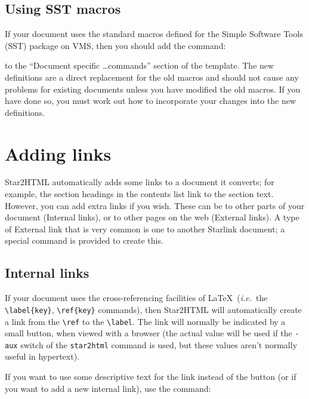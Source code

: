 \documentclass[twoside,11pt,nolof]{starlink}
\begin{document}
\subsection{Using SST macros}

If your document uses the standard macros defined for the Simple
Software Tools (SST) package on VMS, then you should add the command:
\begin{terminalv}

\end{terminalv}
to the ``Document specific \ldots commands'' section of the template.
The new definitions are a direct replacement for the old macros and should not
cause any problems for existing documents unless you have modified the old
macros.
If you have done so, you must work out how to incorporate your changes into
the new definitions.

\section{Adding links}

Star2HTML automatically adds some links to a document it converts; for example,
the section headings in the contents list link to the section text.
However, you can add extra links if you wish.
These can be to other parts of your document (Internal links), or to
other pages on the web (External links).
A type of External link that is very common is one to another Starlink
document; a special command is provided to create this.

\subsection{Internal links}

If your document uses the cross-referencing facilities of \LaTeX\
({\em{i.e.}}\ the \verb+\label{key}+, \verb+\ref{key}+ commands), then
Star2HTML will automatically create a link from the \verb+\ref+ to the
\verb+\label+.
The link will normally be indicated by a small button, when viewed with a
browser (the actual value will be used if the \texttt{-aux} switch of the
\texttt{star2html} command is used, but these values aren't normally useful
in hypertext).

If you want to use some descriptive text for the link instead of the button
(or if you want to add a new internal link), use the command:

\begin{terminalv}
\end{terminalv}
\end{document}
